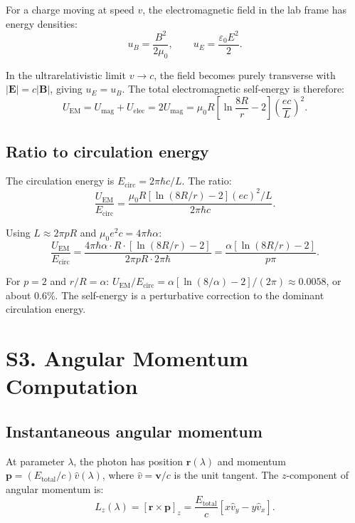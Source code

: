 \documentclass[11pt,a4paper]{article}
\begin{document}
For a charge moving at speed $v$, the electromagnetic field in the lab frame has energy densities:
\begin{equation}
  u_B = \frac{B^2}{2\mu_0}, \qquad u_E = \frac{\varepsilon_0 E^2}{2}.
\end{equation}

In the ultrarelativistic limit $v \to c$, the field becomes purely transverse with $|\mathbf{E}| = c|\mathbf{B}|$, giving $u_E = u_B$. The total electromagnetic self-energy is therefore:
\begin{equation}
  U_{\text{EM}} = U_{\text{mag}} + U_{\text{elec}} = 2U_{\text{mag}} = \mu_0 R\left[\ln\frac{8R}{r} - 2\right]\left(\frac{ec}{L}\right)^{\!2}.
\end{equation}

\subsection{Ratio to circulation energy}

The circulation energy is $E_{\text{circ}} = 2\pi\hbar c / L$. The ratio:
\begin{equation}
  \frac{U_{\text{EM}}}{E_{\text{circ}}} = \frac{\mu_0 R[\ln(8R/r) - 2](ec)^2 / L}{2\pi\hbar c}.
\end{equation}

Using $L \approx 2\pi p R$ and $\mu_0 e^2 c = 4\pi\hbar\alpha$:
\begin{equation}
  \frac{U_{\text{EM}}}{E_{\text{circ}}} = \frac{4\pi\hbar\alpha \cdot R \cdot [\ln(8R/r) - 2]}{2\pi p R \cdot 2\pi\hbar} = \frac{\alpha[\ln(8R/r) - 2]}{p\pi}.
\end{equation}

For $p = 2$ and $r/R = \alpha$: $U_{\text{EM}}/E_{\text{circ}} = \alpha[\ln(8/\alpha) - 2]/(2\pi) \approx 0.0058$, or about 0.6\%. The self-energy is a perturbative correction to the dominant circulation energy.

\section{S3. Angular Momentum Computation}
\label{sec:S3}

\subsection{Instantaneous angular momentum}

At parameter $\lambda$, the photon has position $\mathbf{r}(\lambda)$ and momentum $\mathbf{p} = (E_{\text{total}}/c)\hat{v}(\lambda)$, where $\hat{v} = \mathbf{v}/c$ is the unit tangent. The $z$-component of angular momentum is:
\begin{equation}
  L_z(\lambda) = [\mathbf{r} \times \mathbf{p}]_z = \frac{E_{\text{total}}}{c}\left[x\hat{v}_y - y\hat{v}_x\right].
\end{equation}
\end{document}
